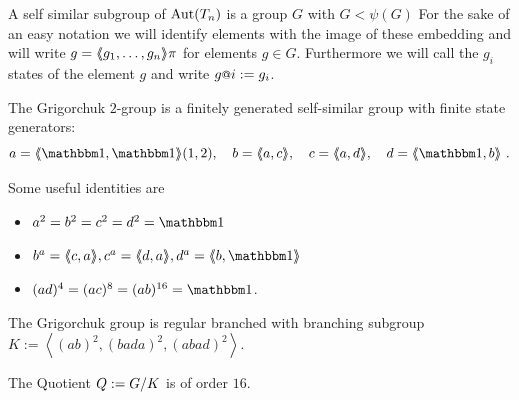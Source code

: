\documentclass[a4paper,11pt]{amsart}
\begin{document}
A self similar subgroup of $\textup{Aut}(T_n)$ is a group $G$ with $G< \psi(G)$ For the sake of an easy notation we
will identify elements with the image of these embedding and will write $g=\langle\negthickspace\langle g_1,\ldots,g_n\rangle\negthickspace\rangle\pi$ for elements $g\in G$. 
Furthermore we will call the $g_i$ states of the element $g$ and write $g\at{i}:=g_i$. 

The Grigorchuk $2$-group is a finitely generated self-similar group with finite state generators:
\[a=\pair{\id,\id}(1,2),\quad b=\pair{a,c},\quad c=\pair{a,d},\quad d=\pair{\id,b}\ . \]

Some useful identities are
\begin{itemize}
 \item $a^2=b^2=c^2=d^2=\id$ 
 \item $b^a= \pair{c,a}, c^a=\pair{d,a}, d^a=\pair{b,\id}$
 \item $(ad)^4=(ac)^8=(ab)^{16}= \id$.
\end{itemize}

\begin{lem}
The Grigorchuk group is regular branched with branching subgroup 
 $K:= \left< (ab)^2,(bada)^2,(abad)^2 \right>$.  
 
 The Quotient $Q := {G/K}$ is of order $16$.
\end{lem}
\end{document}

